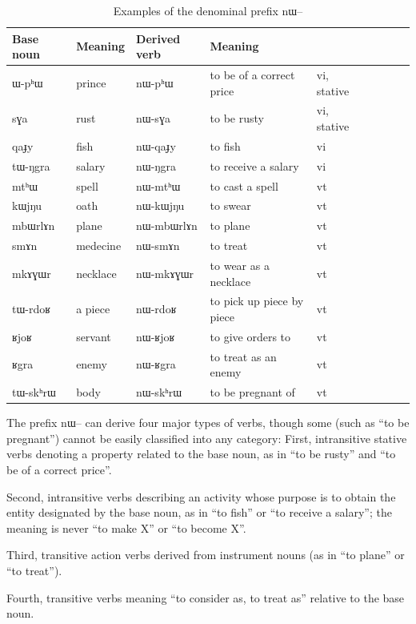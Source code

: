 \documentclass[oldfontcommands,oneside,a4paper,11pt]{article}
\newcommand{\ipa}[1]{{\phon #1}} %
\begin{document}
\begin{table}[H] \centering
\caption{Examples of the denominal prefix \ipa{nɯ}--}\label{tab:denom.pref.nW} 
\begin{tabular}{lllllllll} \toprule
Base noun& Meaning & Derived verb & Meaning & \\
\midrule
\ipa{ɯ-pʰɯ} &prince & \ipa{nɯ-pʰɯ} & to be of a correct price&vi, stative\\
\ipa{sɣa} &rust & \ipa{nɯ-sɣa} &to be rusty &vi, stative\\
\ipa{qaɟy} &fish & \ipa{nɯ-qaɟy} &to fish &vi\\
\ipa{tɯ-ŋgra} &salary & \ipa{nɯ-ŋgra} &to receive a salary &vi\\
\ipa{mtʰɯ} & spell& \ipa{nɯ-mtʰɯ} &to cast a spell &vt\\
\ipa{kɯjŋu} & oath& \ipa{nɯ-kɯjŋu} &to swear &vt\\
\ipa{mbɯrlɤn} &plane & \ipa{nɯ-mbɯrlɤn} &to plane    &vt\\
\ipa{smɤn} &medecine & \ipa{nɯ-smɤn} &to treat    &vt\\
\ipa{mkɤɣɯr} &necklace & \ipa{nɯ-mkɤɣɯr} &to wear as a necklace    &vt\\
\ipa{tɯ-rdoʁ} &a piece & \ipa{nɯ-rdoʁ} &to pick up piece by piece & vt\\
\ipa{ʁjoʁ} & servant& \ipa{nɯ-ʁjoʁ} & to give orders to&vt\\
\ipa{ʁgra} & enemy& \ipa{nɯ-ʁgra} & to treat as an enemy&vt\\
\ipa{tɯ-skʰrɯ} &body  & \ipa{nɯ-skʰrɯ} &to be pregnant of &vt\\
    \bottomrule
\end{tabular}
\end{table}
The prefix  \ipa{nɯ}-- can derive four major types of verbs, though some (such as ``to be pregnant'') cannot be easily classified into any category:
	First, intransitive stative verbs denoting a property related to the base noun, as in ``to be rusty'' and ``to be of a correct price''.
	
	Second, intransitive verbs describing an activity whose purpose is to obtain the entity designated by the base noun, as in ``to fish'' or ``to receive a salary''; the meaning is never ``to make X'' or ``to become X''.
	
	Third, transitive action verbs derived from instrument nouns (as in ``to plane'' or ``to treat'').
	
	Fourth, transitive verbs meaning ``to consider as, to treat as'' relative to the base noun.
\end{document}
